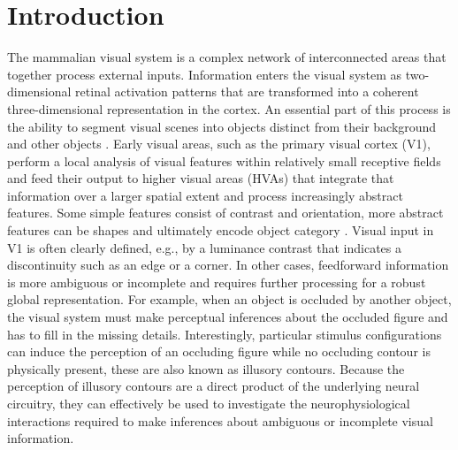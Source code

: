 \documentclass[12pt]{article}
\begin{document}
\section{Introduction}
The mammalian visual system is a complex network of interconnected areas that together process external inputs. Information enters the visual system as two-dimensional retinal activation patterns that are transformed into a coherent three-dimensional representation in the cortex. An essential part of this process is the ability to segment visual scenes into objects distinct from their background and other objects \autocite{kirchbergerEssentialRoleFeedback2020}. Early visual areas, such as the primary visual cortex (V1), perform a local analysis of visual features within relatively small receptive fields and feed their output to higher visual areas (HVAs) that integrate that information over a larger spatial extent and process increasingly abstract features. Some simple features consist of contrast and orientation, more abstract features can be shapes and ultimately encode object category \autocite{ashbridgeEffectImageOrientation2000}. Visual input in V1 is often clearly defined, e.g., by a luminance contrast that indicates a discontinuity such as an edge or a corner. In other cases, feedforward information is more ambiguous or incomplete and requires further processing for a robust global representation. For example, when an object is occluded by another object, the visual system must make perceptual inferences about the occluded figure and has to fill in the missing details. Interestingly, particular stimulus configurations can induce the perception of an occluding figure while no occluding contour is physically present, these are also known as illusory contours. Because the perception of illusory contours are a direct product of the underlying neural circuitry, they can effectively be used to investigate the neurophysiological interactions required to make inferences about ambiguous or incomplete visual information.
\bigbreak
\end{document}
